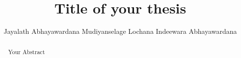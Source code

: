 \documentclass[HSHL, BachelorThesis]{teamhenkler}
\title{Title of your thesis}
\author{Jayalath Abhayawardana Mudiyanselage Lochana Indeewara Abhayawardana}
\begin{document}
\maketitle
\begin{abstract}
	Your Abstract
\end{abstract}

\makedeclaration
\maketoc











 

\appendix


\end{document}

